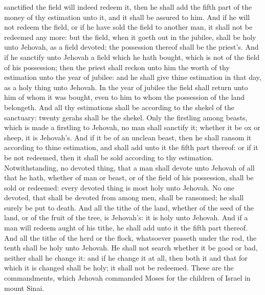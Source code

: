sanctified the field will indeed redeem it, then he shall add the fifth part of the money of thy estimation unto it, and it shall be assured to him. And if he will not redeem the field, or if he have sold the field to another man, it shall not be redeemed any more: but the field, when it goeth out in the jubilee, shall be holy unto Jehovah, as a field devoted; the possession thereof shall be the priest’s. And if he sanctify unto Jehovah a field which he hath bought, which is not of the field of his possession; then the priest shall reckon unto him the worth of thy estimation unto the year of jubilee: and he shall give thine estimation in that day, as a holy thing unto Jehovah. In the year of jubilee the field shall return unto him of whom it was bought, even to him to whom the possession of the land belongeth. And all thy estimations shall be according to the shekel of the sanctuary: twenty gerahs shall be the shekel.  Only the firstling among beasts, which is made a firstling to Jehovah, no man shall sanctify it; whether it be ox or sheep, it is Jehovah’s. And if it be of an unclean beast, then he shall ransom it according to thine estimation, and shall add unto it the fifth part thereof: or if it be not redeemed, then it shall be sold according to thy estimation.  Notwithstanding, no devoted thing, that a man shall devote unto Jehovah of all that he hath, whether of man or beast, or of the field of his possession, shall be sold or redeemed: every devoted thing is most holy unto Jehovah. No one devoted, that shall be devoted from among men, shall be ransomed; he shall surely be put to death.  And all the tithe of the land, whether of the seed of the land, or of the fruit of the tree, is Jehovah’s: it is holy unto Jehovah. And if a man will redeem aught of his tithe, he shall add unto it the fifth part thereof. And all the tithe of the herd or the flock, whatsoever passeth under the rod, the tenth shall be holy unto Jehovah. He shall not search whether it be good or bad, neither shall he change it: and if he change it at all, then both it and that for which it is changed shall be holy; it shall not be redeemed.  These are the commandments, which Jehovah commanded Moses for the children of Israel in mount Sinai. 